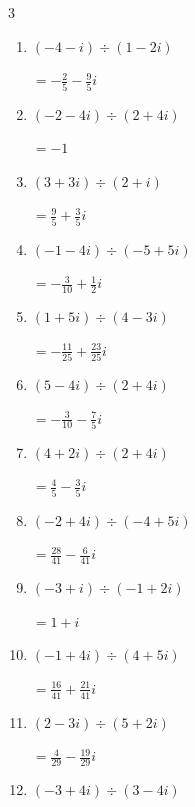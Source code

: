 \begin{multicols}{3}
\begin{enumerate}
        $\displaystyle =-\frac{7}{25}+\frac{1}{25}i$

  \item $\displaystyle (-4-i)\div(1-2i)$

        $\displaystyle =-\frac{2}{5}-\frac{9}{5}i$

  \item $\displaystyle (-2-4i)\div(2+4i)$

        $\displaystyle =-1$

  \item $\displaystyle (3+3i)\div(2+i)$

        $\displaystyle =\frac{9}{5}+\frac{3}{5}i$

  \item $\displaystyle (-1-4i)\div(-5+5i)$

        $\displaystyle =-\frac{3}{10}+\frac{1}{2}i$

  \item $\displaystyle (1+5i)\div(4-3i)$

        $\displaystyle =-\frac{11}{25}+\frac{23}{25}i$

\columnbreak %

  \item $\displaystyle (5-4i)\div(2+4i)$

        $\displaystyle =-\frac{3}{10}-\frac{7}{5}i$

  \item $\displaystyle (4+2i)\div(2+4i)$

        $\displaystyle =\frac{4}{5}-\frac{3}{5}i$

  \item $\displaystyle (-2+4i)\div(-4+5i)$

        $\displaystyle =\frac{28}{41}-\frac{6}{41}i$

  \item $\displaystyle (-3+i)\div(-1+2i)$

        $\displaystyle =1+i$

  \item $\displaystyle (-1+4i)\div(4+5i)$

        $\displaystyle =\frac{16}{41}+\frac{21}{41}i$

  \item $\displaystyle (2-3i)\div(5+2i)$

        $\displaystyle =\frac{4}{29}-\frac{19}{29}i$

  \item $\displaystyle (-3+4i)\div(3-4i)$


\end{enumerate}
\end{multicols}
